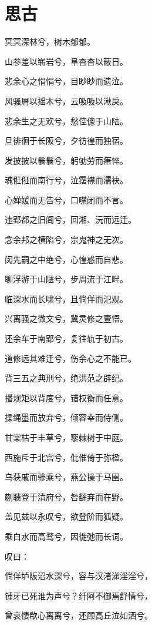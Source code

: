 \documentclass[UTF8,titlepage,oneside]{ctexbook}
\begin{document}
\section*{思古}
\begin{center}
	
	冥冥深林兮，树木郁郁。
	
	山参差以崭岩兮，阜杳杳以蔽日。
	
	悲余心之悁悁兮，目眇眇而遗泣。
	
	风骚屑以摇木兮，云吸吸以湫戾。
	
	悲余生之无欢兮，愁倥傯于山陆。
	
	旦徘徊于长阪兮，夕彷徨而独宿。
	
	发披披以鬤鬤兮，躬劬劳而瘏悴。
	
	魂俇俇而南行兮，泣霑襟而濡袂。
	
	心婵媛而无告兮，口噤闭而不言。
	
	违郢都之旧闾兮，回湘、沅而远迁。
	
	念余邦之横陷兮，宗鬼神之无次。
	
	闵先嗣之中绝兮，心惶惑而自悲。
	
	聊浮游于山陿兮，步周流于江畔。
	
	临深水而长啸兮，且倘佯而氾观。
	
	兴离骚之微文兮，冀灵修之壹悟。
	
	还余车于南郢兮，复往轨于初古。
	
	道修远其难迁兮，伤余心之不能已。
	
	背三五之典刑兮，绝洪范之辟纪。
	
	播规矩以背度兮，错权衡而任意。
	
	操绳墨而放弃兮，倾容幸而侍侧。
	
	甘棠枯于丰草兮，藜棘树于中庭。
	
	西施斥于北宫兮，仳倠倚于弥楹。
	
	乌获戚而骖乘兮，燕公操于马圉。
	
	蒯聩登于清府兮，咎繇弃而在野。
	
	盖见兹以永叹兮，欲登阶而狐疑。
	
	乘白水而高骛兮，因徙弛而长词。
	
	叹曰：
	
	倘佯垆阪沼水深兮，容与汉渚涕淫淫兮，
	
	锺牙已死谁为声兮？纤阿不御焉舒情兮，
	
	曾哀悽欷心离离兮，还顾高丘泣如洒兮。
	
	
\end{center}
\end{document}
